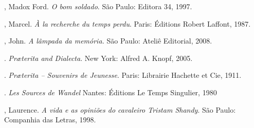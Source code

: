 \enlargethispage{\baselineskip}


 \begin{bibliohedra}
 , Madox Ford. \textit{O bom soldado}. São Paulo: Editora 34, 1997.

 , Marcel. \textit{À la recherche du temps perdu}. Paris: Éditions
 Robert Laffont, 1987.

 , John. \textit{A lâmpada da memória.} São Paulo: Ateliê Editorial, 2008.

 \titidem. \textit{Pr\ae terita and Dialecta}. New York: Alfred A. Knopf, 2005.

 \titidem. \textit{Pr\ae terita -- Souvenirs de Jeunesse}. Paris: Librairie Hachette et Cie, 1911.

 \titidem. \textit{Les Sources de Wandel} Nantes: Éditions Le Temps Singulier, 1980

 , Laurence. \textit{A vida e as opiniões do cavaleiro Tristam
 Shandy}. São Paulo: Companhia das Letras, 1998.
 \end{bibliohedra}

